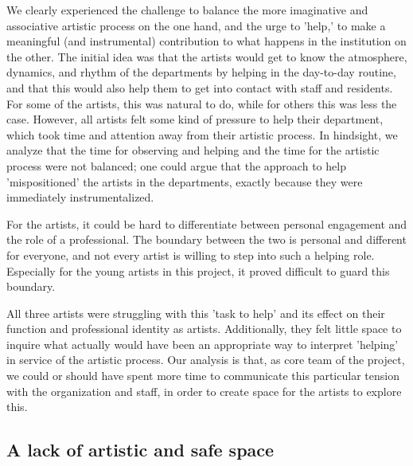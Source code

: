 \documentclass[authordate, empirical]{jote-new-article}
\begin{document}
	We clearly experienced the challenge to balance the more imaginative and associative artistic process on the one hand, and the urge to 'help,' to make a meaningful (and instrumental) contribution to what happens in the institution on the other. The initial idea was that the artists would get to know the atmosphere, dynamics, and rhythm of the departments by helping in the day-to-day routine, and that this would also help them to get into contact with staff and residents. For some of the artists, this was natural to do, while for others this was less the case. However, all artists felt some kind of pressure to help their department, which took time and attention away from their artistic process. In hindsight, we analyze that the time for observing and helping and the time for the artistic process were not balanced; one could argue that the approach to help 'mispositioned' the artists in the departments, exactly because they were immediately instrumentalized.







	For the artists, it could be hard to differentiate between personal engagement and the role of a professional. The boundary between the two is personal and different for everyone, and not every artist is willing to step into such a helping role. Especially for the young artists in this project, it proved difficult to guard this boundary.







	All three artists were struggling with this 'task to help' and its effect on their function and professional identity as artists. Additionally, they felt little space to inquire what actually would have been an appropriate way to interpret 'helping' in service of the artistic process. Our analysis is that, as core team of the project, we could or should have spent more time to communicate this particular tension with the organization and staff, in order to create space for the artists to explore this.



	\subsection{A lack of artistic and safe space}
\end{document}
